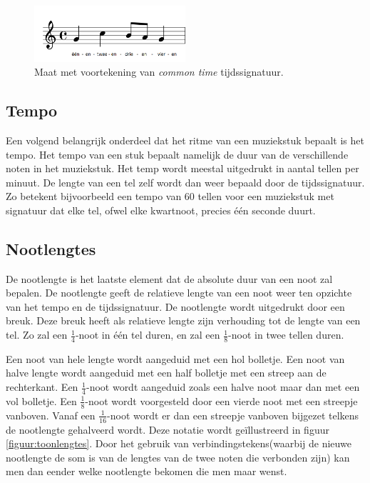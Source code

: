 \begin{figure}[!ht]
  \centering
  \includegraphics[width=0.5\textwidth]{1_Muzikale_Achtergrond/tijdssignatuur}
  \caption{Maat met voortekening van \textit{common time} tijdssignatuur.}
  \label{figuur:tijdssignatuur}
\end{figure}

\subsection{Tempo}
Een volgend belangrijk onderdeel dat het ritme van een muziekstuk bepaalt is het tempo. Het tempo van een stuk bepaalt namelijk de duur van de verschillende noten in het muziekstuk. Het temp wordt meestal uitgedrukt in aantal tellen per minuut. De lengte van een tel zelf wordt dan weer bepaald door de tijdssignatuur. Zo betekent bijvoorbeeld een tempo van 60 tellen voor een muziekstuk met signatuur  dat elke tel, ofwel elke kwartnoot, precies \'e\'en seconde duurt. 

\subsection{Nootlengtes}
De nootlengte is het laatste element dat de absolute duur van een noot zal bepalen. De nootlengte geeft de relatieve lengte van een noot weer ten opzichte van het tempo en de tijdssignatuur. De nootlengte wordt uitgedrukt door een breuk. Deze breuk heeft als relatieve lengte zijn verhouding tot de lengte van een tel. Zo zal een $\frac{1}{4}$-noot in  \'e\'en tel duren, en zal een $\frac{1}{8}$-noot in  twee tellen duren.

Een noot van hele lengte wordt aangeduid met een hol bolletje. Een noot van halve lengte wordt aangeduid met een half bolletje met een streep aan de rechterkant. Een $\frac{1}{4}$-noot wordt aangeduid zoals een halve noot maar dan met een vol bolletje. Een $\frac{1}{8}$-noot wordt voorgesteld door een vierde noot met een streepje vanboven. Vanaf een $\frac{1}{16}$-noot wordt er dan een streepje vanboven bijgezet telkens de nootlengte gehalveerd wordt. Deze notatie wordt ge\"illustreerd in figuur \ref{figuur:toonlengtes}. Door het gebruik van verbindingstekens(waarbij de nieuwe nootlengte de som is van de lengtes van de twee noten die verbonden zijn) kan men dan eender welke nootlengte bekomen die men maar wenst. 

